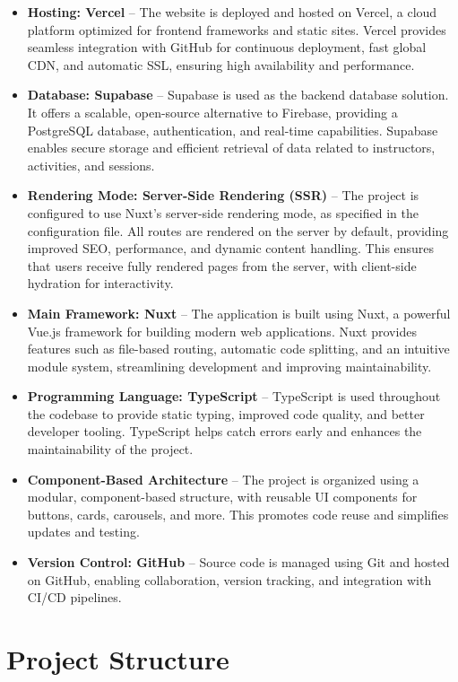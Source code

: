 \begin{itemize}
    \item \textbf{Hosting: Vercel} -- The website is deployed and hosted on Vercel, a cloud platform optimized for frontend frameworks and static sites. Vercel provides seamless integration with GitHub for continuous deployment, fast global CDN, and automatic SSL, ensuring high availability and performance.
    \item \textbf{Database: Supabase} -- Supabase is used as the backend database solution. It offers a scalable, open-source alternative to Firebase, providing a PostgreSQL database, authentication, and real-time capabilities. Supabase enables secure storage and efficient retrieval of data related to instructors, activities, and sessions.
    \item \textbf{Rendering Mode: Server-Side Rendering (SSR)} -- The project is configured to use Nuxt's server-side rendering mode, as specified in the configuration file. All routes are rendered on the server by default, providing improved SEO, performance, and dynamic content handling. This ensures that users receive fully rendered pages from the server, with client-side hydration for interactivity.
    \item \textbf{Main Framework: Nuxt} -- The application is built using Nuxt, a powerful Vue.js framework for building modern web applications. Nuxt provides features such as file-based routing, automatic code splitting, and an intuitive module system, streamlining development and improving maintainability.
    \item \textbf{Programming Language: TypeScript} -- TypeScript is used throughout the codebase to provide static typing, improved code quality, and better developer tooling. TypeScript helps catch errors early and enhances the maintainability of the project.
    \item \textbf{Component-Based Architecture} -- The project is organized using a modular, component-based structure, with reusable UI components for buttons, cards, carousels, and more. This promotes code reuse and simplifies updates and testing.
    \item \textbf{Version Control: GitHub} -- Source code is managed using Git and hosted on GitHub, enabling collaboration, version tracking, and integration with CI/CD pipelines.
\end{itemize}

\section{Project Structure}

